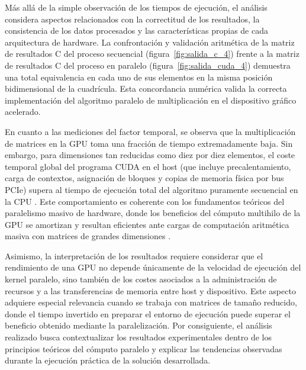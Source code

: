 Más allá de la simple observación de los tiempos de ejecución, el análisis considera aspectos relacionados con la correctitud de los resultados, la consistencia de los datos procesados y las características propias de cada arquitectura de hardware. La confrontación y validación aritmética de la matriz de resultados C del proceso secuencial (figura~\ref{fig:salida_c_4}) frente a la matriz de resultados C del proceso en paralelo (figura~\ref{fig:salida_cuda_4}) demuestra una total equivalencia en cada uno de sus elementos en la misma posición bidimensional de la cuadrícula. Esta concordancia numérica valida la correcta implementación del algoritmo paralelo de multiplicación en el dispositivo gráfico acelerado.

En cuanto a las mediciones del factor temporal, se observa que la multiplicación de matrices en la GPU toma una fracción de tiempo extremadamente baja. Sin embargo, para dimensiones tan reducidas como diez por diez elementos, el coste temporal global del programa CUDA en el host (que incluye precalentamiento, carga de contextos, asignación de bloques y copias de memoria física por bus PCIe) supera al tiempo de ejecución total del algoritmo puramente secuencial en la CPU \cite{nvidiaBestPractices}. Este comportamiento es coherente con los fundamentos teóricos del paralelismo masivo de hardware, donde los beneficios del cómputo multihilo de la GPU se amortizan y resultan eficientes ante cargas de computación aritmética masiva con matrices de grandes dimensiones \cite{awsGPUCPU}.

Asimismo, la interpretación de los resultados requiere considerar que el rendimiento de una GPU no depende únicamente de la velocidad de ejecución del kernel paralelo, sino también de los costes asociados a la administración de recursos y a las transferencias de memoria entre host y dispositivo. Este aspecto adquiere especial relevancia cuando se trabaja con matrices de tamaño reducido, donde el tiempo invertido en preparar el entorno de ejecución puede superar el beneficio obtenido mediante la paralelización. Por consiguiente, el análisis realizado busca contextualizar los resultados experimentales dentro de los principios teóricos del cómputo paralelo y explicar las tendencias observadas durante la ejecución práctica de la solución desarrollada.

